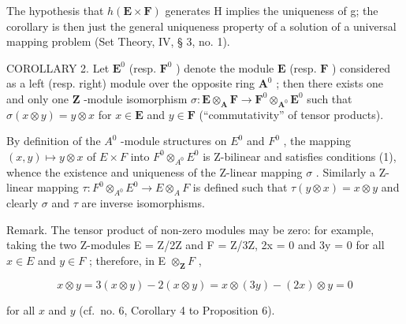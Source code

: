 The hypothesis that \(h(\mathbf{E} \times \mathbf{F})\) generates H implies the uniqueness of g; the corollary is then just the general uniqueness property of a solution of a universal mapping problem (Set Theory, IV, § 3, no. 1).

COROLLARY 2. Let \(\mathbf{E}^0\) (resp. \(\mathbf{F}^0\) ) denote the module \(\mathbf{E}\) (resp. \(\mathbf{F}\) ) considered as a left (resp. right) module over the opposite ring \(\mathbf{A}^0\) ; then there exists one and only one \(\mathbf{Z}\) -module isomorphism \(\sigma: \mathbf{E} \otimes_{\mathbf{A}} \mathbf{F} \to \mathbf{F}^0 \otimes_{\mathbf{A}^0} \mathbf{E}^0\) such that \(\sigma(x \otimes y) = y \otimes x\) for \(x \in \mathbf{E}\) and \(y \in \mathbf{F}\) (``commutativity'' of tensor products).

By definition of the \(A^{0}\) -module structures on \(E^{0}\) and \(F^{0}\) , the mapping \((x,y)\mapsto y\otimes x\) of \(E\times F\) into \(F^{0}\otimes_{A^{0}}E^{0}\) is Z-bilinear and satisfies conditions (1), whence the existence and uniqueness of the Z-linear mapping \(\sigma\) . Similarly a Z-linear mapping \(\tau:F^{0}\otimes_{A^{0}}E^{0}\to E\otimes_{A}F\) is defined such that \(\tau(y\otimes x)=x\otimes y\) and clearly \(\sigma\) and \(\tau\) are inverse isomorphisms.

Remark. The tensor product of non-zero modules may be zero: for example, taking the two Z-modules E = Z/2Z and F = Z/3Z, 2x = 0 and 3y = 0 for all \(x \in E\) and \(y \in F\) ; therefore, in E \(\otimes_{\mathbf{Z}} F\) ,

\[
x \otimes y = 3 (x \otimes y) - 2 (x \otimes y) = x \otimes (3 y) - (2 x) \otimes y = 0
\]

for all \(x\) and \(y\) (cf.~no. 6, Corollary 4 to Proposition 6).

